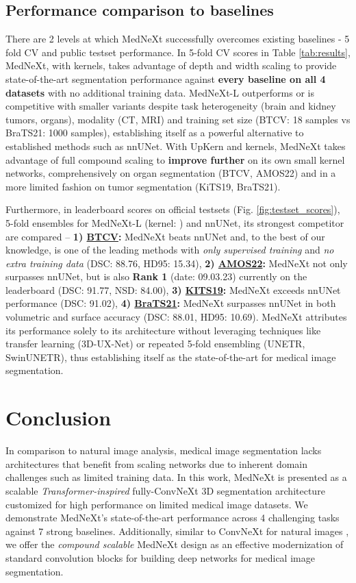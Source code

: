 \documentclass[runningheads]{llncs}
\begin{document}
\subsection{Performance comparison to baselines}
There are 2 levels at which MedNeXt successfully overcomes existing baselines - 5 fold CV and public testset performance. In 5-fold CV scores in Table \ref{tab:results}, MedNeXt, with  kernels, takes advantage of depth and width scaling to provide state-of-the-art segmentation performance against \textbf{every baseline on all 4 datasets} with no additional training data. MedNeXt-L outperforms or is competitive with smaller variants despite task heterogeneity (brain and kidney tumors, organs), modality (CT, MRI) and training set size (BTCV: 18 samples vs BraTS21: 1000 samples), establishing itself as a powerful alternative to established methods such as nnUNet.
With UpKern and  kernels, MedNeXt takes advantage of full compound scaling to \textbf{improve further} on its own small kernel networks, comprehensively on organ segmentation (BTCV, AMOS22) and in a more limited fashion on tumor segmentation (KiTS19, BraTS21). 

Furthermore, in leaderboard scores on official testsets (Fig. \ref{fig:testset_scores}), 5-fold ensembles for MedNeXt-L (kernel: ) and nnUNet, its strongest competitor are compared -- \textbf{1) \underline{BTCV}:} MedNeXt beats nnUNet and, to the best of our knowledge, is one of the leading methods with \textit{only supervised training} and \textit{no extra training data} (DSC: 88.76, HD95: 15.34), \textbf{2) \underline{AMOS22}:} MedNeXt not only surpasses nnUNet, but is also \textbf{Rank 1} (date: 09.03.23) currently on the leaderboard (DSC: 91.77, NSD: 84.00), \textbf{3) \underline{KITS19}:} MedNeXt exceeds nnUNet performance (DSC: 91.02), \textbf{4) \underline{BraTS21}:} MedNeXt surpasses nnUNet in both volumetric and surface accuracy (DSC: 88.01, HD95: 10.69). MedNeXt attributes its performance solely to its architecture without leveraging techniques like transfer learning (3D-UX-Net) or repeated 5-fold ensembling (UNETR, SwinUNETR), thus establishing itself as the state-of-the-art for medical image segmentation.

\section{Conclusion}
In comparison to natural image analysis, medical image segmentation lacks architectures that benefit from scaling networks due to inherent domain challenges such as limited training data. In this work, MedNeXt is presented as a scalable \textit{Transformer-inspired} fully-ConvNeXt 3D segmentation architecture customized for high performance on limited medical image datasets. We demonstrate MedNeXt's state-of-the-art performance across 4 challenging tasks against 7 strong baselines. Additionally, similar to ConvNeXt for natural images \cite{liu2022convnet}, we offer the \textit{compound scalable} MedNeXt design as an effective modernization of standard convolution blocks for building deep networks for medical image segmentation.
\end{document}
